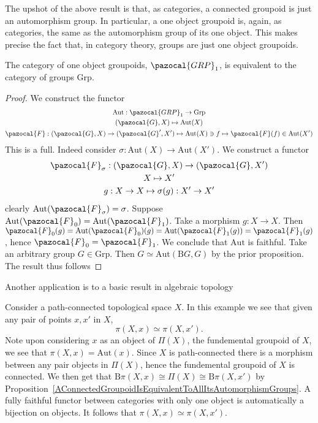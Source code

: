     The upshot of the above result is that, as categories, a connected groupoid is just an automorphism group. In particular, a one object groupoid is, again, as categories, the same as the automorphism group of its one object. This makes precise the fact that, in category theory, groups are just one object groupoids. 
    \begin{corollary}
        The category of one object groupoids, $\pazocal{GRP}_1$, is equivalent to the category of groups $\mathrm{Grp}$. 
    \end{corollary}   
    \begin{proof}
        We construct the functor
        \begin{gather*}
            \mathrm{Aut}: \pazocal{GRP}_{1} \rightarrow \mathrm{Grp}\\
            (\pazocal{G},X)\mapsto \mathrm{Aut}(X)\\
            \pazocal{F} : (\pazocal{G},X)\rightarrow (\pazocal{G}',X') \mapsto \mathrm{Aut}(X)\ni f\mapsto \pazocal{F}(f) \in \mathrm{Aut}(X')
        \end{gather*}
        This is a full. Indeed consider $\sigma : \mathrm{Aut}(X)\rightarrow \mathrm{Aut}(X')$. We construct a functor
        \begin{gather*}
            \pazocal{F}_\sigma : (\pazocal{G},X)\rightarrow (\pazocal{G},X')\\
            X\mapsto X'\\
            g : X\rightarrow X \mapsto \sigma(g) : X'\rightarrow X'
        \end{gather*}
        clearly $\mathrm{Aut}(\pazocal{F}_\sigma)= \sigma$. Suppose $\mathrm{Aut}(\pazocal{F}_0) = \mathrm{Aut}(\pazocal{F}_1)$. Take a morphism $g:X\rightarrow X$. Then $\pazocal{F}_0(g) = \mathrm{Aut}(\pazocal{F}_0)(g)=\mathrm{Aut}(\pazocal{F}_1(g)) = \pazocal{F}_1(g)$, hence $\pazocal{F}_0=\pazocal{F}_1$. We conclude that $\mathrm{Aut}$ is faithful. Take an arbitrary group $G\in \mathrm{Grp}$. Then $G\simeq \mathrm{Aut}(\mathrm{B}G,G)$ by the prior proposition. The result thus follows 
    \end{proof}
    Another application is to a basic result in algebraic topology
    \begin{example}
        Consider a path-connected topological space $X$. In this example we see that given any pair of points $x,x'$ in $X$,
        $$\pi(X,x)\simeq \pi(X,x').$$
        Note upon considering $x$ as an object of $\Pi(X)$, the fundemental groupoid of $X$, we see that $\pi(X,x)=\mathrm{Aut}(x)$. Since $X$ is path-connected there is a morphism between any pair objects in $\Pi(X)$, hence the fundemental groupoid of $X$ is connected. We then get that $\mathrm{B}\pi(X,x)\cong \Pi(X) \cong \mathrm{B}\pi(X,x')$ by Proposition~\ref{AConnectedGroupoidIsEquivalentToAllItsAutomorphismGroups}. A fully faithful functor between categories with only one object is automatically a bijection on objects. It follows that $\pi(X,x)\simeq \pi(X,x')$.  
    \end{example}
